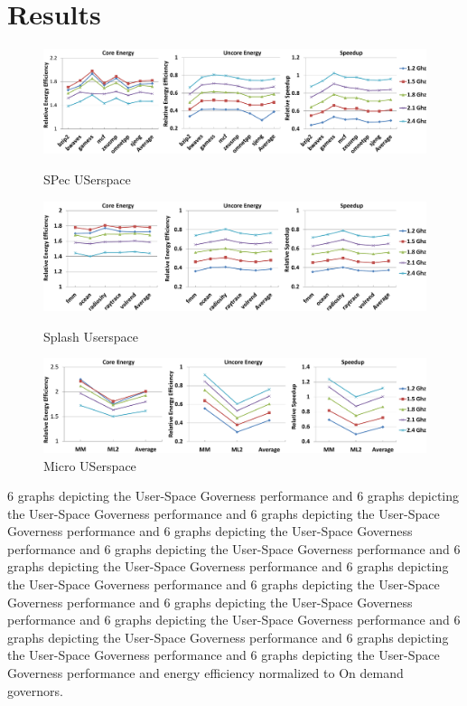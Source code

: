 \section{Results}\label{sec:results}

\begin{figure}[htp]
  \begin{center}
\includegraphics[width=\linewidth]{figs/user-spec-crop.pdf}
  \end{center}
  \vspace{-0.1in}
  \caption{SPec USerspace}
  \label{fig:user-spec}

\includegraphics[width=\linewidth]{figs/user-splash-crop.pdf}
  \vspace{-0.1in}
  \caption{Splash Userspace}
  \label{fig:user-splash}

\includegraphics[width=\linewidth]{figs/user-micro-crop.pdf}
  \vspace{-0.1in}
  \caption{Micro USerspace}
  \label{fig:user-micro}
\end{figure}



6 graphs depicting the User-Space Governess performance and 
6 graphs depicting the User-Space Governess performance and 
6 graphs depicting the User-Space Governess performance and 
6 graphs depicting the User-Space Governess performance and 
6 graphs depicting the User-Space Governess performance and 
6 graphs depicting the User-Space Governess performance and 
6 graphs depicting the User-Space Governess performance and 
6 graphs depicting the User-Space Governess performance and 
6 graphs depicting the User-Space Governess performance and 
6 graphs depicting the User-Space Governess performance and 
6 graphs depicting the User-Space Governess performance and 
6 graphs depicting the User-Space Governess performance and 
6 graphs depicting the User-Space Governess performance and 
energy efficiency normalized to On demand governors.

